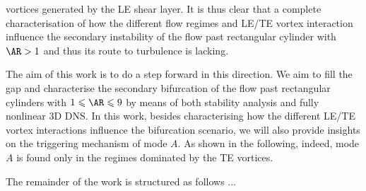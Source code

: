 vortices generated by the LE shear layer. It is thus clear that a complete characterisation of how the different flow regimes and LE/TE vortex interaction influence the secondary instability of the flow past rectangular cylinder with $\AR>1$ and thus its route to turbulence is lacking.
    
The aim of this work is to do a step forward in this direction. We aim to fill the gap and characterise the secondary bifurcation of the flow past rectangular cylinders with $1 \le \AR \le 9$ by means of both stability analysis and fully nonlinear 3D DNS. In this work, besides characterising how the different LE/TE vortex interactions influence the bifurcation scenario, we will also provide insights on the triggering mechanism of mode $A$. As shown in the following, indeed, mode $A$ is found only in the regimes dominated by the TE vortices. 
  
The remainder of the work is structured as follows ...

